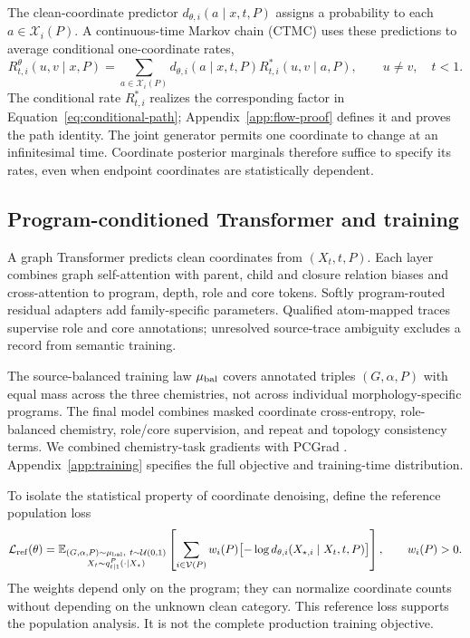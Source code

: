 \documentclass{article}
\theoremstyle{definition}
\begin{document}
The clean-coordinate predictor $d_{\theta,i}(a\mid x,t,P)$ assigns a probability to each
$a\in\mathcal X_i(P)$. A continuous-time Markov chain (CTMC) uses these predictions to average
conditional one-coordinate rates,
\begin{equation}
 R_{t,i}^\theta(u,v\mid x,P)
 =\sum_{a\in\mathcal X_i(P)}d_{\theta,i}(a\mid x,t,P)
 R^*_{t,i}(u,v\mid a,P),\qquad u\neq v,\quad t<1.
 \label{eq:posterior-rate}
\end{equation}
The conditional rate $R^*_{t,i}$ realizes the corresponding factor in
Equation~\ref{eq:conditional-path}; Appendix~\ref{app:flow-proof} defines it and proves the path
identity. The joint generator permits one coordinate to change at an infinitesimal time.
Coordinate posterior marginals therefore suffice to specify its rates, even when endpoint
coordinates are statistically dependent.

\subsection{Program-conditioned Transformer and training}
\label{sec:model-training}

A graph Transformer predicts clean coordinates from $(X_t,t,P)$. Each layer combines graph
self-attention with parent, child and closure relation biases and cross-attention to program,
depth, role and core tokens. Softly program-routed residual adapters add family-specific parameters.
Qualified atom-mapped traces supervise role and core annotations; unresolved source-trace ambiguity
excludes a record from semantic training.

The source-balanced training law $\mu_{\rm bal}$ covers annotated triples $(G,\alpha,P)$ with equal
mass across the three chemistries, not across individual morphology-specific programs. The final
model combines masked coordinate cross-entropy, role-balanced chemistry, role/core supervision,
and repeat and topology consistency terms. We combined chemistry-task gradients with PCGrad
\citep{yu2020gradient}. Appendix~\ref{app:training} specifies the full objective and training-time
distribution.

To isolate the statistical property of coordinate denoising, define the reference population loss
\begin{equation}
 \mathcal L_{\rm ref}(\theta)
 =\mathbb E_{\substack{(G,\alpha,P)\sim\mu_{\rm bal},\ t\sim\mathcal U(0,1)\\
 X_t\sim q_{t\mid1}^P(\cdot\mid X_\star)}}
 \left[\sum_{i\in\mathcal V(P)}w_i(P)
 \bigl[-\log d_{\theta,i}(X_{\star,i}\mid X_t,t,P)\bigr]\right],
 \qquad w_i(P)>0.
 \label{eq:primary-loss}
\end{equation}
The weights depend only on the program; they can normalize coordinate counts without depending
on the unknown clean category. This reference loss supports the population analysis. It is not
the complete production training objective.
\end{document}
